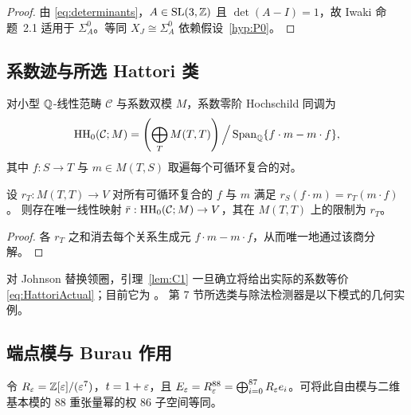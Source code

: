 \begin{proof}
由 \eqref{eq:determinants}，$A\in\mathrm{SL}(3,\mathbb{Z})$ 且 $\det(A-I)=1$，故 Iwaki 命题~2.1 \cite{Iwaki2024} 适用于 $\Sigma_A^0$。等同 $X_J\cong\Sigma_A^0$ 依赖假设~\ref{hyp:P0}。
\end{proof}

\subsection{系数迹与所选 Hattori 类}

\begin{definition}[系数迹]\label{def:coefficient-HH0}
对小型 $\mathbb{Q}$-线性范畴 $\mathcal C$ 与系数双模 $M$，系数零阶 Hochschild 同调为
\[
\operatorname{HH}_{0}(\mathcal C;M)=
\left(\bigoplus_{T}M(T,T)\right)
\Big/
\operatorname{Span}_{\mathbb{Q}}\{f\cdot m-m\cdot f\},
\]
其中 $f:S\to T$ 与 $m\in M(T,S)$ 取遍每个可循环复合的对。
\end{definition}

\begin{lemma}[通过系数迹的下降]\label{lem:HH0-descent}
设 $r_T:M(T,T)\to V$ 对所有可循环复合的 $f$ 与 $m$ 满足 $r_S(f\cdot m)=r_T(m\cdot f)$。
则存在唯一线性映射 $\bar r:\operatorname{HH}_{0}(\mathcal C;M)\to V$，其在 $M(T,T)$ 上的限制为 $r_T$。
\end{lemma}

\begin{proof}
各 $r_T$ 之和消去每个关系生成元 $f\cdot m-m\cdot f$，从而唯一地通过该商分解。
\end{proof}

对 Johnson 替换领圈，引理~\ref{lem:C1} 一旦确立将给出实际的系数等价 \eqref{eq:HattoriActual}；目前它为 \Open。
第 7 节所选类与除法检测器是以下模式的几何实例。

\subsection{端点模与 Burau 作用}

\begin{definition}[端点模]\label{def:endpoint-module}
令 $R_\varepsilon=\mathbb{Z}[\varepsilon]/(\varepsilon^7)$，$t=1+\varepsilon$，且
$E_\varepsilon=R_\varepsilon^{88}=\bigoplus_{i=0}^{87}R_\varepsilon e_i$。可将此自由模与二维基本模的
$88$ 重张量幂的权 $86$ 子空间等同。
\end{definition}


